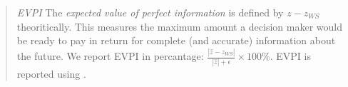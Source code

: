\begin{quote}
\noindent\textit{EVPI} The \textit{expected value of perfect information} is defined by $z-z_{WS}$ theoritically. This measures the maximum amount a decision maker would be ready to pay in return for complete (and accurate) information about the future.  We report EVPI in percantage: $\frac{|\hat{z}-\hat{z}_{WS}|}{|\hat{z}|+\epsilon}\times 100\%$. EVPI is reported using \cplex.
\end{quote}








